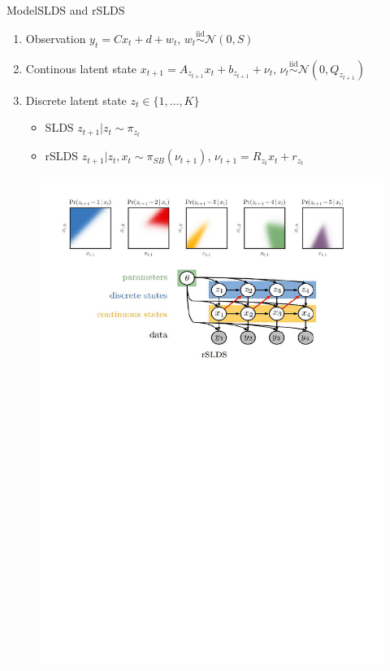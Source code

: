 \documentclass{beamer}
\begin{document}
\begin{frame}{Model}{SLDS and rSLDS}

\begin{tcolorbox}[colback=blue!10!white,colframe=blue!50!black,title=Model Set-up,boxrule=2pt, boxsep=0.1em, left=0.1em, right=0.1em,
fontupper=\fontsize{8}{10}\selectfont] %
\begin{enumerate}[\textbullet]
\item Observation $y_t=C x_t+d+w_t\text{, }w_t \overset{\mathrm{iid}}{\sim} \mathcal{N}(0,S)$
\item Continous latent state $x_{t+1}=A_{z_{t+1}}x_t+b_{z_{t+1}}+\nu_t \text{, } \nu_t \overset{\mathrm{iid}}{\sim} \mathcal{N}(0,Q_{z_{t+1}})$
    \item Discrete latent state $z_t \in \{1,\dots,K\}$
        \begin{itemize}
            \item SLDS 
$z_{t+1} | z_t \sim \pi_{z_t}$
            \item rSLDS
 $z_{t+1} | z_t, x_t \sim \pi_{SB}(\nu_{t+1})$, $\nu_{t+1}=R_{z_t}x_t+r_{z_t}$
        \end{itemize}
\end{enumerate}
\end{tcolorbox}

\begin{figure}
    \centering
    \includegraphics[width=0.7\linewidth]{gallery/model_p1.pdf}
    \caption{}
  \end{figure}




\end{frame}
\end{document}

